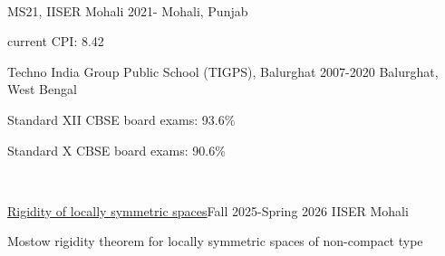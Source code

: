 \documentclass{LoLaTeXcv}
\begin{document}



\

\begin{lltxJob}{
		MS21, IISER Mohali}{
		2021-}{
		Mohali, Punjab}
	\item current CPI: 8.42
\end{lltxJob}


\begin{lltxJob}
	{
		Techno India Group Public School (TIGPS), Balurghat}{
		2007-2020}{
		Balurghat, West Bengal}
	\item Standard XII CBSE board exams: 93.6\%
	\item Standard X CBSE board exams: 90.6\%
\end{lltxJob}



\

\begin{lltxJob}{\href{https://dub.sh/thesisms}{Rigidity of locally symmetric spaces}}{Fall 2025-Spring 2026}{ IISER Mohali}
	\item Mostow rigidity theorem for locally symmetric spaces of non-compact type
\end{lltxJob}
\end{document}
